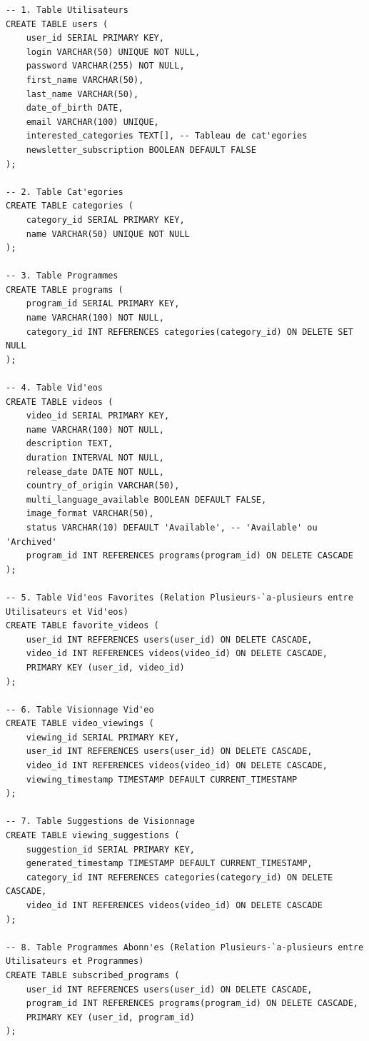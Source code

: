 \documentclass[a4paper, 12pt]{article}
\begin{document}
\begin{lstlisting}
-- 1. Table Utilisateurs
CREATE TABLE users (
    user_id SERIAL PRIMARY KEY,
    login VARCHAR(50) UNIQUE NOT NULL,
    password VARCHAR(255) NOT NULL,
    first_name VARCHAR(50),
    last_name VARCHAR(50),
    date_of_birth DATE,
    email VARCHAR(100) UNIQUE,
    interested_categories TEXT[], -- Tableau de cat'egories
    newsletter_subscription BOOLEAN DEFAULT FALSE
);

-- 2. Table Cat'egories
CREATE TABLE categories (
    category_id SERIAL PRIMARY KEY,
    name VARCHAR(50) UNIQUE NOT NULL
);

-- 3. Table Programmes
CREATE TABLE programs (
    program_id SERIAL PRIMARY KEY,
    name VARCHAR(100) NOT NULL,
    category_id INT REFERENCES categories(category_id) ON DELETE SET NULL
);

-- 4. Table Vid'eos
CREATE TABLE videos (
    video_id SERIAL PRIMARY KEY,
    name VARCHAR(100) NOT NULL,
    description TEXT,
    duration INTERVAL NOT NULL,
    release_date DATE NOT NULL,
    country_of_origin VARCHAR(50),
    multi_language_available BOOLEAN DEFAULT FALSE,
    image_format VARCHAR(50),
    status VARCHAR(10) DEFAULT 'Available', -- 'Available' ou 'Archived'
    program_id INT REFERENCES programs(program_id) ON DELETE CASCADE
);

-- 5. Table Vid'eos Favorites (Relation Plusieurs-`a-plusieurs entre Utilisateurs et Vid'eos)
CREATE TABLE favorite_videos (
    user_id INT REFERENCES users(user_id) ON DELETE CASCADE,
    video_id INT REFERENCES videos(video_id) ON DELETE CASCADE,
    PRIMARY KEY (user_id, video_id)
);

-- 6. Table Visionnage Vid'eo
CREATE TABLE video_viewings (
    viewing_id SERIAL PRIMARY KEY,
    user_id INT REFERENCES users(user_id) ON DELETE CASCADE,
    video_id INT REFERENCES videos(video_id) ON DELETE CASCADE,
    viewing_timestamp TIMESTAMP DEFAULT CURRENT_TIMESTAMP
);

-- 7. Table Suggestions de Visionnage
CREATE TABLE viewing_suggestions (
    suggestion_id SERIAL PRIMARY KEY,
    generated_timestamp TIMESTAMP DEFAULT CURRENT_TIMESTAMP,
    category_id INT REFERENCES categories(category_id) ON DELETE CASCADE,
    video_id INT REFERENCES videos(video_id) ON DELETE CASCADE
);

-- 8. Table Programmes Abonn'es (Relation Plusieurs-`a-plusieurs entre Utilisateurs et Programmes)
CREATE TABLE subscribed_programs (
    user_id INT REFERENCES users(user_id) ON DELETE CASCADE,
    program_id INT REFERENCES programs(program_id) ON DELETE CASCADE,
    PRIMARY KEY (user_id, program_id)
);
\end{lstlisting}
\end{document}

